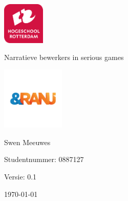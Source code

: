 \documentclass{report}
\newcommand{\versionnumber}{0.1}
\newcommand{\name}{Swen Meeuwes}
\newcommand{\studentnumber}{0887127}
\renewcommand{\title}{Narratieve bewerkers in serious games}
\newcommand{\subtitle}{}
\begin{document}
\begin{titlepage}
        \centering
        \includegraphics[width=2cm]{University}\par
        \vspace{4\baselineskip}
        {\Huge\title\par}
        {\Large\subtitle\par}
        \par
        \includegraphics[width=3cm]{Organisation}
        \vspace{4\baselineskip}
        \par
        {\Large\name\par}
        {Studentnummer: \studentnumber\par}
        \vfill
        {\hfill Versie: \versionnumber\par}
        {\hfill \today}
\end{titlepage}



\tableofcontents














\end{document}
